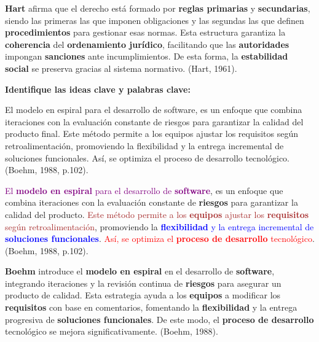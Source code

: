 \documentclass[
11pt, %
]{beamer}
\begin{document}
\begin{frame}
	\begin{block}{} %
		\textbf{Hart} afirma que el derecho está formado por \textbf{reglas primarias} y \textbf{secundarias}, siendo las primeras las que imponen obligaciones y las segundas las que definen \textbf{procedimientos} para gestionar esas normas. Esta estructura garantiza la \textbf{coherencia} del \textbf{ordenamiento jurídico}, facilitando que las \textbf{autoridades} impongan \textbf{sanciones} ante incumplimientos. De esta forma, la \textbf{estabilidad social} se preserva gracias al sistema normativo. (Hart, 1961).
	\end{block}
\end{frame}



\begin{frame}
	\textbf{Identifique las ideas clave y palabras clave:}
	\begin{block}{} %
		El modelo en espiral para el desarrollo de software, es un enfoque que combina iteraciones con la evaluación constante de riesgos para garantizar la calidad del producto final. Este método permite a los equipos ajustar los requisitos según retroalimentación, promoviendo la flexibilidad y la entrega incremental de soluciones funcionales. Así, se optimiza el proceso de desarrollo tecnológico. (Boehm, 1988, p.102).
	\end{block}
\end{frame}

\begin{frame}
	\begin{block}{} %
		\textcolor{purple}{El \textbf{modelo en espiral} para el desarrollo de \textbf{software}}, es un enfoque que combina iteraciones con la evaluación constante de \textbf{riesgos} para garantizar la calidad del producto. \textcolor{brown}{Este método permite a los \textbf{equipos} ajustar los \textbf{requisitos} según retroalimentación}, promoviendo la \textcolor{blue}{\textbf{flexibilidad} y la entrega incremental de \textbf{soluciones funcionales}}. \textcolor{red}{Así, se optimiza el \textbf{proceso de desarrollo} tecnológico}. (Boehm, 1988, p.102).
	\end{block}
\end{frame}

\begin{frame}
	\begin{block}{} %
		\textbf{Boehm} introduce el \textbf{modelo en espiral} en el desarrollo de \textbf{software}, integrando iteraciones y la revisión continua de \textbf{riesgos} para asegurar un producto de calidad. Esta estrategia ayuda a los \textbf{equipos} a modificar los \textbf{requisitos} con base en comentarios, fomentando la \textbf{flexibilidad} y la entrega progresiva de \textbf{soluciones funcionales}. De este modo, el \textbf{proceso de desarrollo} tecnológico se mejora significativamente. (Boehm, 1988).
	\end{block}
\end{frame}
\end{document}
